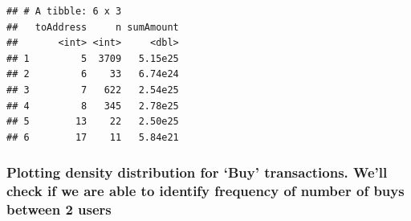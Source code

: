 \documentclass[]{article}
\newenvironment{Shaded}{\begin{snugshade}}{\end{snugshade}}
\newcommand{\KeywordTok}[1]{\textcolor[rgb]{0.13,0.29,0.53}{\textbf{#1}}}
\newcommand{\DataTypeTok}[1]{\textcolor[rgb]{0.13,0.29,0.53}{#1}}
\newcommand{\StringTok}[1]{\textcolor[rgb]{0.31,0.60,0.02}{#1}}
\newcommand{\CommentTok}[1]{\textcolor[rgb]{0.56,0.35,0.01}{\textit{#1}}}
\newcommand{\OperatorTok}[1]{\textcolor[rgb]{0.81,0.36,0.00}{\textbf{#1}}}
\newcommand{\NormalTok}[1]{#1}
\begin{document}
\begin{Shaded}
\end{Shaded}

\begin{verbatim}
## # A tibble: 6 x 3
##   toAddress     n sumAmount
##       <int> <int>     <dbl>
## 1         5  3709   5.15e25
## 2         6    33   6.74e24
## 3         7   622   2.54e25
## 4         8   345   2.78e25
## 5        13    22   2.50e25
## 6        17    11   5.84e21
\end{verbatim}

\subsubsection{\texorpdfstring{Plotting density distribution for `Buy'
transactions. We'll check if we are able to identify frequency of number
of buys between 2
users}{Plotting density distribution for Buy transactions. We'll check if we are able to identify frequency of number of buys between 2 users}}\label{plotting-density-distribution-for-buy-transactions.-well-check-if-we-are-able-to-identify-frequency-of-number-of-buys-between-2-users}
\end{document}
